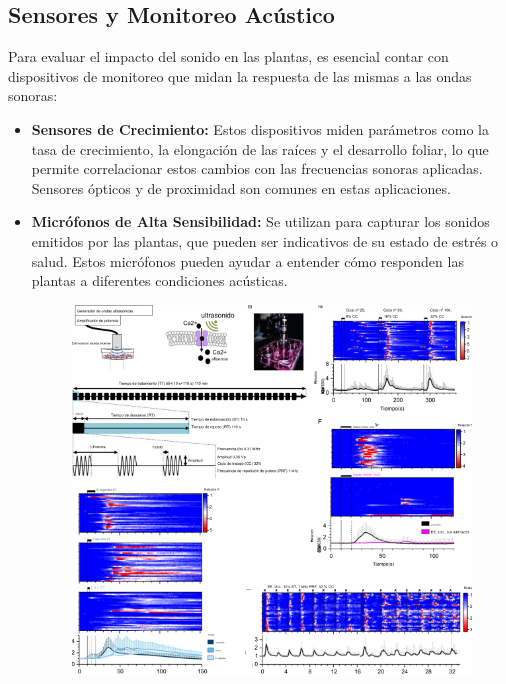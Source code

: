 \documentclass[twocolumn]{article}
\begin{document}
\subsection{Sensores y Monitoreo Acústico}

Para evaluar el impacto del sonido en las plantas, es esencial contar con dispositivos de monitoreo que midan la respuesta de las mismas a las ondas sonoras:

\begin{itemize}
    \item \textbf{Sensores de Crecimiento:} Estos dispositivos miden parámetros como la tasa de crecimiento, la elongación de las raíces y el desarrollo foliar, lo que permite correlacionar estos cambios con las frecuencias sonoras aplicadas. Sensores ópticos y de proximidad son comunes en estas aplicaciones.

    \item \textbf{Micrófonos de Alta Sensibilidad:} Se utilizan para capturar los sonidos emitidos por las plantas, que pueden ser indicativos de su estado de estrés o salud. Estos micrófonos pueden ayudar a entender cómo responden las plantas a diferentes condiciones acústicas.
    \begin{figure}[!h]
        \centering
        \includegraphics[width=\linewidth]{imagenes/Captura desde 2024-09-25 22-49-42.png}       
    \end{figure}
\end{itemize}
\end{document}
